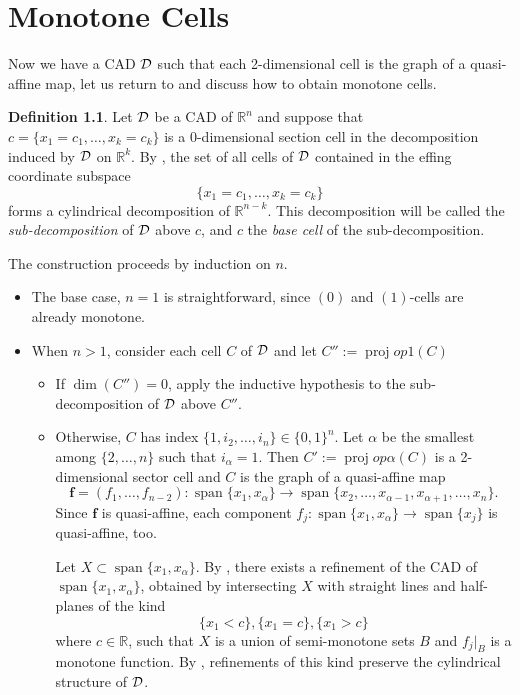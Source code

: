 \documentclass[
]{book}
\theoremstyle{definition}
\newtheorem{definition}{Definition}[chapter]
\theoremstyle{definition}
\theoremstyle{definition}
\theoremstyle{definition}
\theoremstyle{remark}
\begin{document}
\hypertarget{sec:monotone-cells}{%
\chapter{Monotone Cells}\label{sec:monotone-cells}}

Now we have a CAD \(\cal D\) such that each 2-dimensional cell is the graph of a quasi-affine map, let us return to \citep[ Theorem 3.20]{bgv15} and discuss how to obtain monotone cells.

\begin{definition}
\protect\hypertarget{def:sub-cad}{}\label{def:sub-cad}Let \(\cal D\) be a CAD of \(\mathbb{R}^n\) and suppose that \(c = \{ x_1 = c_1,\dots,x_k = c_k \}\) is a \(0\)-dimensional section cell in the decomposition induced by \(\cal D\) on \(\mathbb{R}^k\).
By \citep[ Remark 3.8]{bgv15}, the set of all cells of \(\cal D\) contained in the effing coordinate subspace
\[
\{ x_1=c_1,\dots,x_k=c_k \}
\]
forms a cylindrical decomposition of \(\mathbb{R}^{n-k}\). This decomposition will be called the \emph{sub-decomposition} of \(\cal D\) above \(c\), and \(c\) the \emph{base cell} of the sub-decomposition.
\end{definition}

The construction proceeds by induction on \(n\).

\begin{itemize}
\item
  The base case, \(n=1\) is straightforward, since \((0)\) and \((1)\)-cells are already monotone.
\item
  When \(n>1\), consider each cell \(C\) of \(\cal D\) and let \(C'' := \operatorname{proj}op{1}(C)\)

  \begin{itemize}
  \item
    If \(\dim(C'') = 0\), apply the inductive hypothesis to the sub-decomposition of \(\cal D\) above \(C''\).
  \item
    Otherwise, \(C\) has index \(\{1,i_2,\dots,i_n\} \in \{0,1\}^n\). Let \(\alpha\) be the smallest among \(\{2,\dots,n\}\) such that \(i_\alpha = 1\).
    Then \(C' := \operatorname{proj}op{\alpha}(C)\) is a 2-dimensional sector cell and \(C\) is the graph of a quasi-affine map
    \[
    \mathbf{f} = (f_1,\dots,f_{n-2}) : {\operatorname{span} \{x_1,x_\alpha\}} \to {\operatorname{span} \{x_2,\ldots,x_{\alpha - 1}, x_{\alpha+1},\ldots,x_n\}}.
    \]
    Since \(\mathbf{f}\) is quasi-affine, each component \(f_j : {\operatorname{span} \{x_1,x_\alpha\}} \to {\operatorname{span} \{x_j\}}\) is quasi-affine, too.

    Let \(X \subset {\operatorname{span} \{x_1,x_\alpha\}}\). By \citep[Lemma 3.18]{bgv15}, there exists a refinement of the CAD of \({\operatorname{span} \{x_1,x_\alpha\}}\), obtained by intersecting \(X\) with straight lines and half-planes of the kind
    \[
    \{x_1 < c\}, \{x_1 = c\}, \{x_1 > c\}
    \]
    where \(c \in \mathbb{R}\), such that \(X\) is a union of semi-monotone sets \(B\) and \(f_j\vert_B\) is a monotone function.
    By \citep[ Lemma 3.11]{bgv15}, refinements of this kind preserve the cylindrical structure of \(\cal D\).
  \end{itemize}
\end{itemize}
\end{document}
